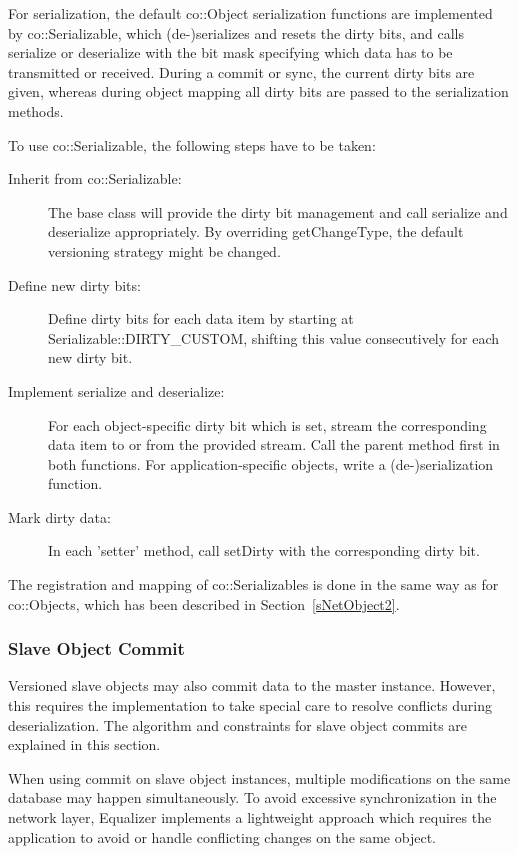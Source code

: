 \documentclass[10pt,a4]{scrartcl}
\newcommand{\sref}[1]{Section~\ref{#1}}
\begin{document}
For serialization, the default \textsf{co::Object} serialization functions are
implemented by \textsf{co::Serializable}, which (de-)serializes and
resets the dirty bits, and calls \textsf{serialize} or \textsf{deserialize} with
the bit mask specifying which data has to be transmitted or received. During a
commit or sync, the current dirty bits are given, whereas during object mapping
all dirty bits are passed to the serialization methods.

To use \textsf{co::Serializable}, the following steps have to be taken:

\begin{description}
\item[Inherit from \textsf{co::Serializable}:] The base class will
  provide the dirty bit management and call serialize and deserialize
  appropriately. By overriding \textsf{get\-Chan\-ge\-Type}, the default
  versioning strategy might be changed.
\item[Define new dirty bits:] Define dirty bits for each data item by
  starting at \textsf{Serializable::DIRTY\_CUSTOM}, shifting this value
  consecutively for each new dirty bit.
\item[Implement serialize and deserialize:] For each object-specific
  dirty bit which is set, stream the corresponding data item to or from
  the provided stream. Call the parent method first in both
  functions. For application-specific objects, write a (de-)serialization
  function.
\item[Mark dirty data:] In each 'setter' method, call \textsf{setDirty}
  with the corresponding dirty bit.
\end{description}

The registration and mapping of \textsf{co::Serializable}s is done in the same
way as for \textsf{co::Object}s, which has been described in
\sref{sNetObject2}.

\subsubsection{\label{sSlaveCommit}Slave Object Commit}

Versioned slave objects may also commit data to the master instance. However,
this requires the implementation to take special care to resolve conflicts
during deserialization. The algorithm and constraints for slave object commits
are explained in this section.

When using \textsf{commit} on slave object instances, multiple modifications on
the same database may happen simultaneously. To avoid excessive synchronization
in the network layer, Equalizer implements a lightweight approach which requires
the application to avoid or handle conflicting changes on the same object.
\end{document}
